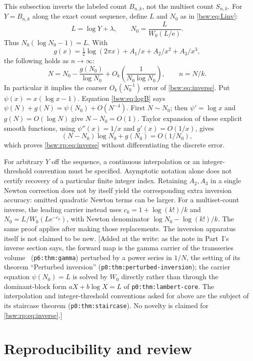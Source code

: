 \documentclass[11pt,letterpaper]{article}
\theoremstyle{definition}
\theoremstyle{remark}
\newcommand{\ee}{\mathrm e}
\begin{document}
This subsection inverts the labeled count $B_{n,k}$, not the multiset count
$S_{n,k}$.  For $Y=B_{n,k}$ along the exact count sequence, define $L$ and
$N_0$ as in \eqref{bsw:eq:Linv}:
\[
 L=\log Y+\lambda,\qquad N_0=\frac{L}{W_0(L/\ee)}.
\]
Thus $N_0(\log N_0-1)=L$.  With
\[
 g(x)=\tfrac12\log(2\pi x)+A_1/x+A_2/x^2+A_3/x^3,
\]
the following holds as $n\to\infty$:
\begin{equation}\label{bsw:rp:eq:inverse}
 N=N_0-\frac{g(N_0)}{\log N_0}
 +O_k\left(\frac1{N_0\log N_0}\right),\qquad n=N/k.
\end{equation}
In particular it implies the coarser $O_k(N_0^{-1})$ error of
\eqref{bsw:eq:inverse}.  Put $\psi(x)=x(\log x-1)$.  Equation
\eqref{bsw:eq:logB} says $\psi(N)+g(N)=\psi(N_0)+O(N^{-4})$.  First
$N\sim N_0$; then $\psi'=\log x$ and $g(N)=O(\log N)$ give $N-N_0=O(1)$.
Taylor expansion of these explicit smooth functions, using
$\psi''(x)=1/x$ and $g'(x)=O(1/x)$, gives
\[
 (N-N_0)\log N_0+g(N_0)=O(1/N_0),
\]
which proves \eqref{bsw:rp:eq:inverse} without differentiating the discrete
error.

For arbitrary $Y$ off the sequence, a continuous interpolation or an
integer-threshold convention must be specified.  Asymptotic notation alone
does not certify recovery of a particular finite integer index.  Retaining
$A_2,A_3$ in a single Newton correction does not by itself yield the
corresponding extra inversion accuracy: omitted quadratic Newton terms can
be larger.  For a multiset-count inverse, the leading carrier instead uses
$c_k=1+\log(k!)/k$ and $N_0=L/W_0(L\ee^{-c_k})$, with Newton denominator
$\log N_0-\log(k!)/k$.  The same proof applies after making those
replacements.  The inversion apparatus itself is not claimed to be new.
[Added at the write: as the note in Part~I's inverse section says, the
forward map is the gamma carrier of the transseries volume~\cite{tai}
(\texttt{p6:thm:gamma}) perturbed by a power series in $1/N$, the setting
of its theorem ``Perturbed inversion''
(\texttt{p0:thm:perturbed-inversion}); the carrier equation
$\psi(N_0)=L$ is solved by $W_0$ directly rather than through the
dominant-block form $aX+b\log X=L$ of \texttt{p0:thm:lambert-core}.  The
interpolation and integer-threshold conventions asked for above are the
subject of its staircase theorem (\texttt{p0:thm:staircase}).  No novelty
is claimed for \eqref{bsw:rp:eq:inverse}.]

\section{Reproducibility and review}\label{bsw:rp:sec:repro}
\begingroup\setlength{\emergencystretch}{3em}
\end{document}
